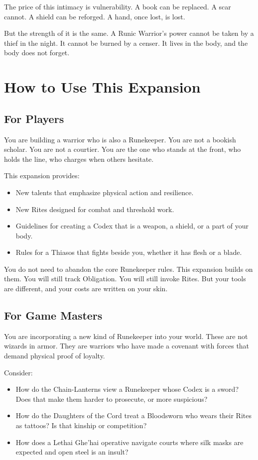 The price of this intimacy is vulnerability. A book can be replaced. A scar cannot. A shield can be reforged. A hand, once lost, is lost.

But the strength of it is the same. A Runic Warrior's power cannot be taken by a thief in the night. It cannot be burned by a censer. It lives in the body, and the body does not forget.

\section{How to Use This Expansion}

\subsection{For Players}

You are building a warrior who is also a Runekeeper. You are not a bookish scholar. You are not a courtier. You are the one who stands at the front, who holds the line, who charges when others hesitate.

This expansion provides:

\begin{itemize}
\item New talents that emphasize physical action and resilience.
\item New Rites designed for combat and threshold work.
\item Guidelines for creating a Codex that is a weapon, a shield, or a part of your body.
\item Rules for a Thiasos that fights beside you, whether it has flesh or a blade.
\end{itemize}

You do not need to abandon the core Runekeeper rules. This expansion builds on them. You will still track Obligation. You will still invoke Rites. But your tools are different, and your costs are written on your skin.

\subsection{For Game Masters}

You are incorporating a new kind of Runekeeper into your world. These are not wizards in armor. They are warriors who have made a covenant with forces that demand physical proof of loyalty.

Consider:

\begin{itemize}
\item How do the Chain-Lanterns view a Runekeeper whose Codex is a sword? Does that make them harder to prosecute, or more suspicious?
\item How do the Daughters of the Cord treat a Bloodsworn who wears their Rites as tattoos? Is that kinship or competition?
\item How does a Lethai Ghe'hai operative navigate courts where silk masks are expected and open steel is an insult?
\end{itemize}

